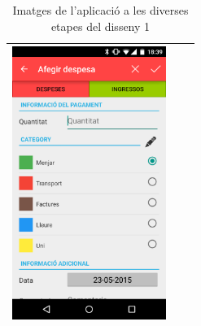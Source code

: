 \begin{table}
\begin{tabular}{| c | c | c |}
\includegraphics[width=50mm]{3_Add_expense.png} \\
\hline
\end{tabular}
\caption{Imatges de l'aplicació a les diverses etapes del disseny 1}
\label{table:images_app1}
\end{table}

